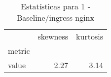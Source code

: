 \begin{table}[htbp]
\caption{Estatísticas para 1 - Baseline/ingress-nginx}
\label{tab:1_-_baseline_ingress-nginx_skewkurt}
\begin{tabular}{lrr}
\toprule
 & skewness & kurtosis \\
metric &  &  \\
\midrule
value & 2.27 & 3.14 \\
\bottomrule
\end{tabular}
\end{table}
